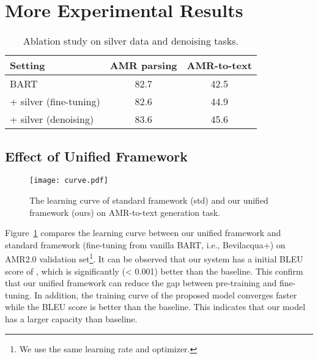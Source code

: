 \documentclass[11pt]{article}
\begin{document}
\section{More Experimental Results}\label{appendix:more-experiments}


\begin{table}
	\centering
	\small
	\begin{tabular}{lcc}
		\toprule
        \textbf{Setting} & AMR parsing & AMR-to-text \\
		\midrule 	
		BART & 82.7 & 42.5 \\
		\quad + silver (fine-tuning) & 82.6 & 44.9 \\
		\quad + silver (denoising)  & 83.6 & 45.6 \\
	\bottomrule
	\end{tabular}
	\caption{Ablation study on silver data and denoising tasks.}
	\label{tab:ablation2}
\end{table}




\subsection{Effect of Unified Framework}\label{appendix:effect}
\begin{figure}
	\centering
	\texttt{[image: curve.pdf]}
	\caption{The learning curve of standard framework (std) and our unified framework (ours) on AMR-to-text generation task.}
	\label{fig:curve}
\end{figure}
Figure~\ref{fig:curve} compares the learning curve between our unified framework and standard framework (fine-tuning from vanilla BART, i.e., Bevilacqua+) on AMR2.0 validation set\footnote{We use the same learning rate and optimizer.}.
It can be observed that our system has a initial BLEU score of , which is significantly (< 0.001) better than the baseline.
This confirm that our unified framework can reduce the gap between pre-training and fine-tuning.
In addition, the training curve of the proposed model converges faster while the BLEU score is better than the baseline. 
This indicates that our model has a larger capacity than baseline.
\end{document}
